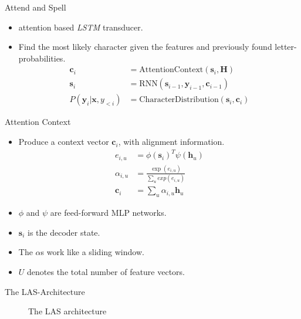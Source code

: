 \documentclass{beamer}
\begin{document}
\begin{frame}{Attend and Spell}
\begin{itemize}
	\item attention based \textit{LSTM} transducer.
	\item Find the most likely character given the features and previously found letter-probabilities.
		  \begin{align}
			\mathbf{c}_i &= \text{AttentionContext}(\mathbf{s}_i,\mathbf{H}) \\
			\mathbf{s}_i &= \text{RNN}(\mathbf{s}_{i-1},\mathbf{y}_{i-1},\mathbf{c}_{i-1}) \\
			P(\mathbf{y}_i|\mathbf{x},y_{<i}) &= \text{CharacterDistribution}(\mathbf{s}_i,\mathbf{c}_{i})
		  \end{align}

\end{itemize}
\end{frame}
\begin{frame}{Attention Context}
	\begin{itemize}
		\item Produce a context vector $\mathbf{c}_i$, with alignment information.
			  \begin{align}
			  	e_{i,u} &= \phi(\mathbf{s}_i)^T \psi(\mathbf{h}_u) \\
			  	\alpha_{i,u} &= \frac{\exp(e_{i,u})}{\sum_u exp(e_{i,u})} \\
			  	\mathbf{c}_i &= \sum\limits_{u} \alpha_{i,u}\mathbf{h}_u 
			  \end{align}
		\item $\phi$ and $\psi$ are feed-forward MLP networks.
		\item $\mathbf{s}_i$ is the decoder state.
		\item The $\alpha$s work like a sliding window.
		\item $U$ denotes the total number of feature vectors.
	\end{itemize}
\end{frame}

\begin{frame}{The LAS-Architecture}
\begin{figure}

\caption{The LAS architecture}
\label{fig:las}
\end{figure}
\end{frame}
\end{document}
